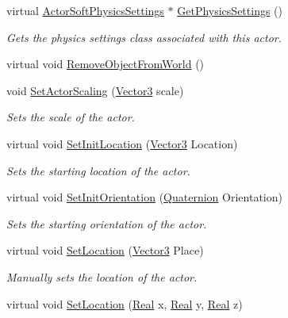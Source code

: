 \begin{DoxyCompactItemize}
virtual \hyperlink{classMezzanine_1_1ActorSoftPhysicsSettings}{ActorSoftPhysicsSettings} $\ast$ \hyperlink{classMezzanine_1_1ActorSoft_a9d2960eee35ecfefe76fce2dde3ea18e}{GetPhysicsSettings} ()
\begin{DoxyCompactList}\small\item\em Gets the physics settings class associated with this actor. \item\end{DoxyCompactList}\item 
virtual void \hyperlink{classMezzanine_1_1ActorSoft_a11cb2b406639b1dac2f9e396741f8f44}{RemoveObjectFromWorld} ()
\item 
void \hyperlink{classMezzanine_1_1ActorSoft_ab76bcb0d227374ef5d69878783c7f89b}{SetActorScaling} (\hyperlink{classMezzanine_1_1Vector3}{Vector3} scale)
\begin{DoxyCompactList}\small\item\em Sets the scale of the actor. \item\end{DoxyCompactList}\item 
virtual void \hyperlink{classMezzanine_1_1ActorSoft_a45178fcaf06a81e75d7d81b8fc90fc9e}{SetInitLocation} (\hyperlink{classMezzanine_1_1Vector3}{Vector3} Location)
\begin{DoxyCompactList}\small\item\em Sets the starting location of the actor. \item\end{DoxyCompactList}\item 
virtual void \hyperlink{classMezzanine_1_1ActorSoft_a8ee3cce8eb7578cdeb2af771f16ab240}{SetInitOrientation} (\hyperlink{classMezzanine_1_1Quaternion}{Quaternion} Orientation)
\begin{DoxyCompactList}\small\item\em Sets the starting orientation of the actor. \item\end{DoxyCompactList}\item 
virtual void \hyperlink{classMezzanine_1_1ActorSoft_a9c96f61e8a39fc6b35eb35c03b8e0e42}{SetLocation} (\hyperlink{classMezzanine_1_1Vector3}{Vector3} Place)
\begin{DoxyCompactList}\small\item\em Manually sets the location of the actor. \item\end{DoxyCompactList}\item 
virtual void \hyperlink{classMezzanine_1_1ActorSoft_aad9c559bae769ac44d437a0612934bc2}{SetLocation} (\hyperlink{namespaceMezzanine_a726731b1a7df72bf3583e4a97282c6f6}{Real} x, \hyperlink{namespaceMezzanine_a726731b1a7df72bf3583e4a97282c6f6}{Real} y, \hyperlink{namespaceMezzanine_a726731b1a7df72bf3583e4a97282c6f6}{Real} z)

\end{DoxyCompactItemize}
